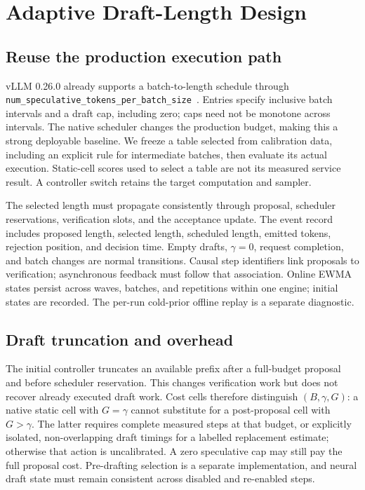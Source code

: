 \documentclass[10pt,twocolumn]{article}
\begin{document}
\section{Adaptive Draft-Length Design}
\subsection{Reuse the production execution path}
vLLM 0.26.0 already supports a batch-to-length schedule through \texttt{num\_speculative\_tokens\_per\_batch\_size}~\cite{vllmdynamic,vllmconfig}. Entries specify inclusive batch intervals and a draft cap, including zero; caps need not be monotone across intervals. The native scheduler changes the production budget, making this a strong deployable baseline. We freeze a table selected from calibration data, including an explicit rule for intermediate batches, then evaluate its actual execution. Static-cell scores used to select a table are not its measured service result. A controller switch retains the target computation and sampler.

The selected length must propagate consistently through proposal, scheduler reservations, verification slots, and the acceptance update. The event record includes proposed length, selected length, scheduled length, emitted tokens, rejection position, and decision time. Empty drafts, $\gamma=0$, request completion, and batch changes are normal transitions. Causal step identifiers link proposals to verification; asynchronous feedback must follow that association. Online EWMA states persist across waves, batches, and repetitions within one engine; initial states are recorded. The per-run cold-prior offline replay is a separate diagnostic.

\subsection{Draft truncation and overhead}
The initial controller truncates an available prefix after a full-budget proposal and before scheduler reservation. This changes verification work but does not recover already executed draft work. Cost cells therefore distinguish $(B,\gamma,G)$: a native static cell with $G=\gamma$ cannot substitute for a post-proposal cell with $G>\gamma$. The latter requires complete measured steps at that budget, or explicitly isolated, non-overlapping draft timings for a labelled replacement estimate; otherwise that action is uncalibrated. A zero speculative cap may still pay the full proposal cost. Pre-drafting selection is a separate implementation, and neural draft state must remain consistent across disabled and re-enabled steps.
\end{document}
